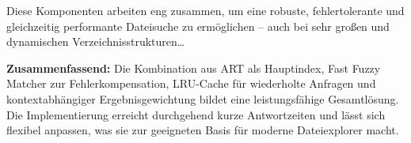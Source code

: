 Diese Komponenten arbeiten eng zusammen, um eine robuste, fehlertolerante und gleichzeitig performante Dateisuche zu ermöglichen – auch bei sehr großen und dynamischen Verzeichnisstrukturen\dots

\textbf{Zusammenfassend:}
Die Kombination aus ART als Hauptindex, Fast Fuzzy Matcher zur Fehlerkompensation, LRU-Cache für wiederholte Anfragen und kontextabhängiger Ergebnisgewichtung bildet eine leistungsfähige Gesamtlösung.
Die Implementierung erreicht durchgehend kurze Antwortzeiten und lässt sich flexibel anpassen, was sie zur geeigneten Basis für moderne Dateiexplorer macht.
